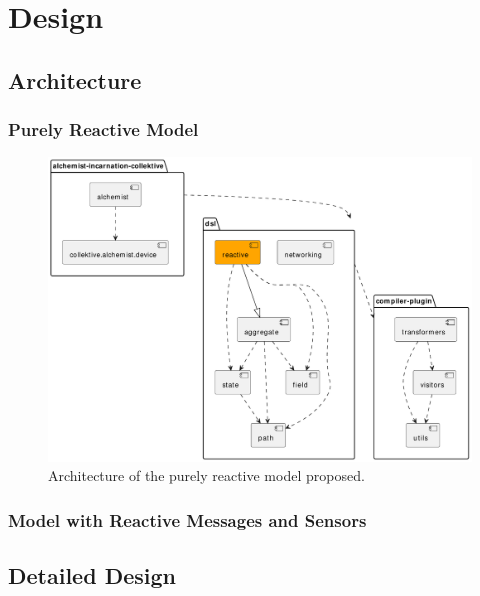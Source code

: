 
\chapter{Design}
\label{chap:design}

\section{Architecture}

\subsection{Purely Reactive Model}

\begin{figure}
    \centering
    \includegraphics[width=\linewidth]{figures/collektive-prm-architecture.pdf}
    \caption{Architecture of the purely reactive model proposed.}
    \label{fig:collektive-prm-architecture}
\end{figure}

\subsection{Model with Reactive Messages and Sensors}

\section{Detailed Design}

